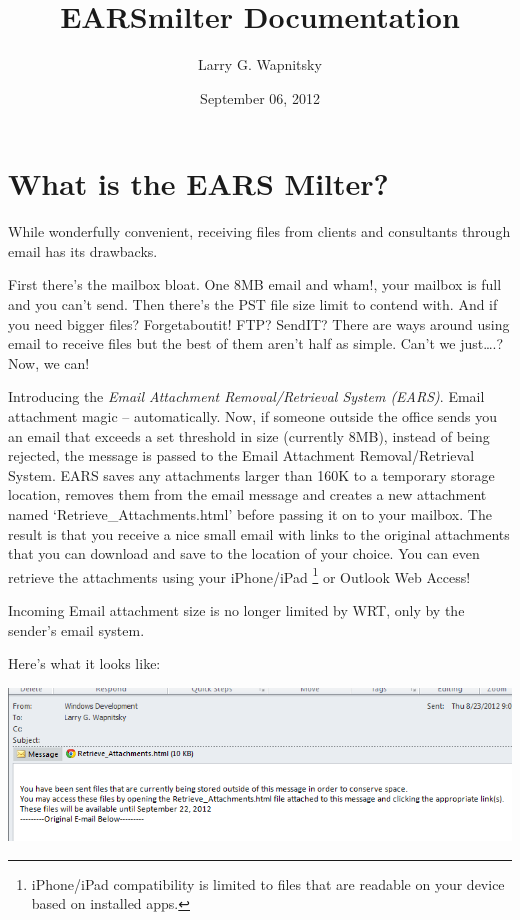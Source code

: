 \documentclass[letterpaper,10pt,english]{sphinxmanual}
\title{EARSmilter Documentation}
\date{September 06, 2012}
\author{Larry G. Wapnitsky}
\begin{document}
\maketitle
\tableofcontents
{}\label{index::doc}



\chapter{What is the EARS Milter?}
\label{about:wrt-e-mail-attachment-removal-retrieval-system-ears-milter}\label{about::doc}\label{about:what-is-the-ears-milter}
While wonderfully convenient, receiving files from clients and consultants through email has its drawbacks.

First there’s the mailbox bloat. One 8MB email and wham!, your mailbox is full and you can’t send.
Then there’s the PST file size limit to contend with.
And if you need bigger files? Forgetaboutit!
FTP? SendIT? There are ways around using email to receive files but the best of them aren’t half as simple.
Can’t we just….? Now, we can!

Introducing the \emph{Email Attachment Removal/Retrieval System (EARS)}. Email
attachment magic – automatically. Now, if someone outside the office sends you
an email that exceeds a set threshold in size (currently 8MB), instead of being
rejected, the message is passed to the Email Attachment Removal/Retrieval
System. EARS saves any attachments larger than 160K to a temporary storage
location, removes them from the email message and creates a new attachment
named ‘Retrieve\_Attachments.html’ before passing it on to your mailbox. The
result is that you receive a nice small email with links to the original
attachments that you can download and save to the location of your choice. You
can even retrieve the attachments using your iPhone/iPad \footnote{
iPhone/iPad compatibility is limited to files that are readable on your device based on installed apps.
} or Outlook Web
Access!

Incoming Email attachment size is no longer limited by WRT, only by the sender’s email system.

Here’s what it looks like:

\includegraphics{EARSmilter.png}
\end{document}
